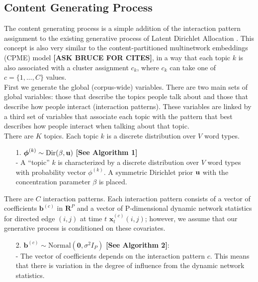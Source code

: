 \documentclass[a4paper]{article}
\begin{document}
\subsection{Content Generating Process} \label{subsec: Content Generating Process}
The content generating process is a simple addition of the interaction pattern assignment to the existing generative process of Latent Dirichlet Allocation \cite{Blei2003}. This concept is also very similar to the content-partitioned multinetwork embeddings (CPME) model {\bf [ASK BRUCE FOR CITES]}, in a way that each topic $k$ is also associated with a cluster assignment $c_k$, where $c_k$ can take one of $c = \{1,...,C\}$ values. \\ \newline
First we generate the global (corpus-wide) variables. There are two main sets of global variables:
those that describe the topics people talk about and those that describe how people interact (interaction patterns). These variables are linked by a third set of variables that associate each topic with the pattern that best describes how people interact when talking about that topic.\\ \newline
There are $K$ topics. Each topic $k$ is a discrete distribution over $V$ word types.
\begin{itemize}
	\item[1.] {$\boldsymbol{\phi}^{(k)} \sim \mbox{Dir}(\beta, \bf u)$} \textbf{[See Algorithm 1]}\\
	- A “topic” $k$ is characterized by a discrete distribution over $V$ word types with probability vector $\phi^{(k)}$. A symmetric Dirichlet prior $\bf u$ with the concentration parameter $\beta$ is placed.
\end{itemize}
\noindent There are $C$ interaction patterns. Each interaction pattern consists of a vector of coefficients $\boldsymbol{b}^{(c)}$ in $\boldsymbol{R}^{P}$ and a vector of P-dimensional dynamic network statistics for directed edge $(i, j)$ at time $t$ $\boldsymbol{x}^{(c)}_t(i, j)$; however, we assume that our generative process is conditioned on these covariates. 
\begin{itemize}
	\item[2.] $\boldsymbol{b}^{(c)}\sim \mbox{Normal}(\textbf{0}, \sigma^2I_P)$ \textbf{[See Algorithm 2]}: \\
		- The vector of coefficients depends on the interaction pattern $c$. This means that there is variation in the degree of influence from the dynamic network statistics.
	\end{itemize}
\end{document}
